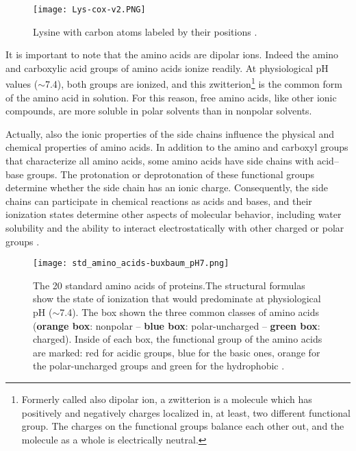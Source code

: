 \begin{figure}[h]
\centering
\begin{minipage}[t]{0.8\textwidth}
\centering
\texttt{[image: Lys-cox-v2.PNG]}

\caption{\small{Lysine with carbon atoms labeled by their positions
\cite{nelson2008lehninger}.}}

\label{fig:Lysine}
\end{minipage} 
\end{figure}

It is important to note that the amino acids are dipolar ions. Indeed the amino and carboxylic acid groups of amino acids ionize readily. 
At physiological pH values ($\sim$7.4), both groups are ionized, and this zwitterion\footnote{Formerly called also dipolar ion, a zwitterion is a molecule which has positively and negatively charges localized in, at least, two different functional group. The charges on the functional groups balance each other out, and the molecule as a whole is electrically neutral.} is the common form of the amino acid in solution. 
For this reason, free amino acids, like other ionic compounds, are more soluble in polar solvents than in nonpolar solvents. 

Actually, also the ionic properties of the side chains influence the physical and chemical properties of amino acids. In addition to the amino and carboxyl groups that characterize all amino acids, some amino acids have side chains with acid--base groups. The protonation or deprotonation of these functional groups determine whether the side chain has an ionic charge. Consequently, the side chains can participate in chemical reactions as acids and bases, and their ionization states determine other aspects of molecular behavior, including water solubility and the ability to interact electrostatically with other charged or polar groups
\cite{voet2016fundamentals}.

\begin{figure}[h]
\centering
\begin{minipage}[t]{\textwidth}
\centering
\texttt{[image: std\_amino\_acids-buxbaum\_pH7.png]}

\caption{\small{The 20 standard amino acids of proteins.The structural formulas show the state of ionization that would predominate at physiological pH ($\sim$7.4). The box shown the three common classes of amino acids (\textbf{orange box}: nonpolar -- \textbf{blue box}: polar-uncharged -- \textbf{green box}: charged). Inside of each box, the functional group of the amino acids are marked: red for acidic groups, blue for the basic ones, orange for the polar-uncharged groups and green for the hydrophobic 
\cite{buxbaum2007fundamentals}.}}

\label{fig:StdAminoAcids}
\end{minipage} 
\end{figure}

